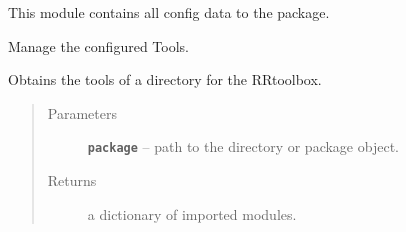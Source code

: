 \documentclass[letterpaper,10pt,english]{sphinxmanual}
\begin{document}
This module contains all config data to the package.

\begin{fulllineitems}
\label{RRtoolbox.lib:RRtoolbox.lib.config.ConfigTool}
Manage the configured Tools.

\begin{fulllineitems}
\label{RRtoolbox.lib:RRtoolbox.lib.config.ConfigTool.getTools}
Obtains the tools of a directory for the RRtoolbox.
\begin{quote}\begin{description}
\item[{Parameters}] \leavevmode
\textbf{\texttt{package}} -- path to the directory or package object.

\item[{Returns}] \leavevmode
a dictionary of imported modules.

\end{description}\end{quote}

\end{fulllineitems}


\end{fulllineitems}

\end{document}
